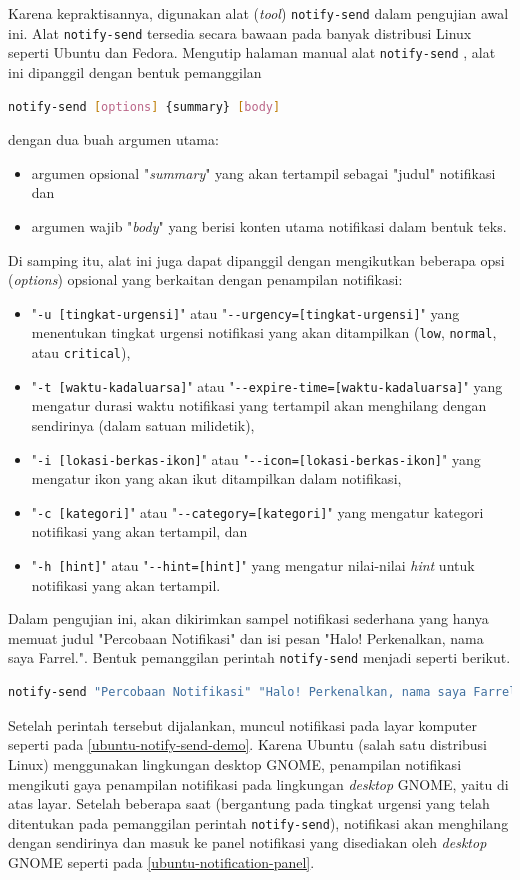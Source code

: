 Karena kepraktisannya, digunakan alat (\textit{tool}) \verb|notify-send| dalam pengujian awal ini. Alat \verb|notify-send| tersedia secara bawaan pada banyak distribusi Linux seperti Ubuntu dan Fedora. Mengutip halaman manual alat \verb|notify-send| \cite{notify-send-man-page}, alat ini dipanggil dengan bentuk pemanggilan
\begin{lstlisting}[language=bash]
    notify-send [options] {summary} [body]
\end{lstlisting}
dengan dua buah argumen utama:
\begin{itemize}
    \item argumen opsional "\textit{summary}" yang akan tertampil sebagai "judul" notifikasi dan
    \item argumen wajib "\textit{body}" yang berisi konten utama notifikasi dalam bentuk teks.
\end{itemize}
Di samping itu, alat ini juga dapat dipanggil dengan mengikutkan beberapa opsi (\textit{options}) opsional yang berkaitan dengan penampilan notifikasi:
\begin{itemize}
    \item "\verb|-u [tingkat-urgensi]|" atau "\verb|--urgency=[tingkat-urgensi]|" yang menentukan tingkat urgensi notifikasi yang akan ditampilkan (\verb|low|, \verb|normal|, atau \verb|critical|),
    \item "\verb|-t [waktu-kadaluarsa]|" atau "\verb|--expire-time=[waktu-kadaluarsa]|" yang mengatur durasi waktu notifikasi yang tertampil akan menghilang dengan sendirinya (dalam satuan milidetik),
    \item "\verb|-i [lokasi-berkas-ikon]|" atau "\verb|--icon=[lokasi-berkas-ikon]|" yang mengatur ikon yang akan ikut ditampilkan dalam notifikasi,
    \item "\verb|-c [kategori]|" atau "\verb|--category=[kategori]|" yang mengatur kategori notifikasi yang akan tertampil, dan
    \item "\verb|-h [hint]|" atau "\verb|--hint=[hint]|" yang mengatur nilai-nilai \textit{hint} untuk notifikasi yang akan tertampil.
\end{itemize}

Dalam pengujian ini, akan dikirimkan sampel notifikasi sederhana yang hanya memuat judul "Percobaan Notifikasi" dan isi pesan "Halo! Perkenalkan, nama saya Farrel.". Bentuk pemanggilan perintah \verb|notify-send| menjadi seperti berikut.
\begin{lstlisting}[language=bash]
    notify-send "Percobaan Notifikasi" "Halo! Perkenalkan, nama saya Farrel."
\end{lstlisting}
Setelah perintah tersebut dijalankan, muncul notifikasi pada layar komputer seperti pada \autoref{ubuntu-notify-send-demo}. Karena Ubuntu (salah satu distribusi Linux) menggunakan lingkungan desktop GNOME, penampilan notifikasi mengikuti gaya penampilan notifikasi pada lingkungan \textit{desktop} GNOME, yaitu di atas layar. Setelah beberapa saat (bergantung pada tingkat urgensi yang telah ditentukan pada pemanggilan perintah \verb|notify-send|), notifikasi akan menghilang dengan sendirinya dan masuk ke panel notifikasi yang disediakan oleh \textit{desktop} GNOME seperti pada \autoref{ubuntu-notification-panel}.

